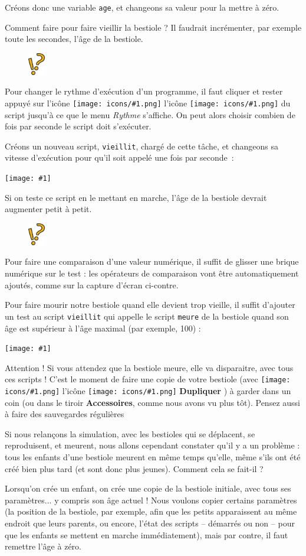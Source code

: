 \documentclass[a4paper,12pt]{book}
\newcommand{\capture}[1]
{
\begin{center}
	\texttt{[image: \#1]}
\end{center}
}
\newcommand{\code}[1]{\texttt{#1}}
\newcommand{\important}[1]{\textbf{#1}}
\newcommand{\inserticon}[1]
{
\texttt{[image: icons/\#1.png]}
}
\newcommand{\icon}[2][]
{
\ifthenelse {\equal{#1} {}} {\inserticon{#2}} {l'icône \inserticon{#2} \important{#1}}
}
\newcommand{\afaire}[1]
{
#1
}
\newcommand{\astuce}[1]
{
\begin{framed}
\begin{figure}
	\vspace{-15pt}
	\includegraphics[width=2.0em]{astuce.png}
\end{figure}
#1
\end{framed}
}
\let\myMargin\marginpar
\renewcommand{\marginpar}[1]{\myMargin{{\scriptsize \sffamily #1}}}
\begin{document}
\afaire {
Créons donc une variable \code{age}, et changeons sa valeur pour la mettre à zéro.

Comment faire pour faire \og vieillir \fg la bestiole ? Il faudrait incrémenter, par exemple toute les secondes, l'âge de la bestiole.

\astuce{Pour changer le rythme d'exécution d'un programme, il faut cliquer et rester appuyé sur l'icône \icon{horlogestop} du script jusqu'à ce que le menu \textit{Rythme} s'affiche. On peut alors choisir combien de fois par seconde le script doit s'exécuter.}
Créons un nouveau script, \code{vieillit}, chargé de cette tâche, et changeons sa vitesse d'exécution pour qu'il soit appelé une fois par seconde~:

\capture{44.png}

Si on teste ce script en le mettant en marche, l'âge de la bestiole devrait augmenter petit à petit.

\astuce{Pour faire une comparaison d'une valeur numérique, il suffit de glisser une brique numérique sur le test : les opérateurs de comparaison vont être automatiquement ajoutés, comme sur la capture d'écran ci-contre.}
Pour faire mourir notre bestiole quand elle devient trop vieille, il suffit d'ajouter un test au script \code{vieillit} qui appelle le script \code{meure} de la bestiole quand son âge est supérieur à l'âge maximal (par exemple, 100) :

\capture{45.png}

}

Attention ! Si vous attendez que la bestiole meure, elle va disparaitre, avec tous ces scripts ! C'est le moment de faire une copie de votre bestiole (avec \icon[Dupliquer]{dupliquer}) à garder dans un coin (ou dans le tiroir \important{Accessoires}, comme nous avons vu plus tôt). Pensez aussi à faire des sauvegardes régulières

Si nous relançons la simulation, avec les bestioles qui se déplacent, se reproduisent, et meurent, nous allons cependant constater qu'il y a un problème : tous les enfants d'une bestiole meurent en même temps qu'elle, même s'ils ont été créé bien plus tard (et sont donc plus jeunes). Comment cela se fait-il ?

Lorsqu'on crée un enfant, on crée une copie de la bestiole initiale, avec tous ses paramètres... y compris son âge actuel ! Nous voulons copier certains paramètres (la position de la bestiole, par exemple, afin que les petits apparaissent au même endroit que leurs parents, ou encore, l'état des scripts -- démarrés ou non -- pour que les enfants se mettent en marche immédiatement), mais par contre, il faut remettre l'âge à zéro.
\end{document}
